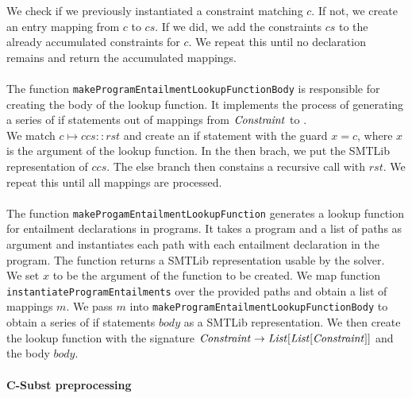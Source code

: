 We check if we previously instantiated a constraint matching $c$.
If not, we create an entry mapping from $c$ to $cs$.
If we did, we add the constraints $cs$ to the already
accumulated constraints for $c$.
We repeat this until no declaration remains
and return the accumulated mappings.\\
\\
The function \lstinline{makeProgramEntailmentLookupFunctionBody}
is responsible for creating the body of the lookup function.
It implements the process of generating a series
of if statements out of mappings from $\mathit{Constraint}$ to \Constrss.\\
%
We match $c \mapsto ccs :: rst$
and create an if statement with the guard $x = c$,
where $x$ is the argument of the lookup function.
In the then brach, we put the SMTLib representation of $ccs$.
The else branch then constains a recursive call with $rst$.
We repeat this until all mappings are processed.\\
\\
The function \lstinline{makeProgamEntailmentLookupFunction}
generates a lookup function for entailment declarations in programs.
It takes a program and a list of paths as argument
and instantiates each path with each
entailment declaration in the program.
The function returns a SMTLib representation usable by the solver.\\
%
We set $x$ to be the argument of the function to be created.
We map function \lstinline{instantiateProgramEntailments}
over the provided paths and obtain a list of mappings $m$.
We pass $m$ into \lstinline{makeProgramEntailmentLookupFunctionBody}
to obtain a series of if statements $body$ as a SMTLib representation.
We then create the lookup function with the signature
$\mathit{Constraint} \rightarrow \mathit{List[\mathit{List[\mathit{Constraint}]}]}$ and the body $body$.

\newpage
\paragraph{C-Subst preprocessing}

